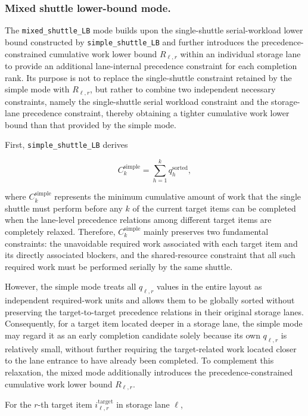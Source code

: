 \subsubsection{Mixed shuttle lower-bound mode.}

The \texttt{mixed\_shuttle\_LB} mode builds upon the single-shuttle
serial-workload lower bound constructed by \texttt{simple\_shuttle\_LB} and
further introduces the precedence-constrained cumulative work lower bound
\(R_{\ell,r}\) within an individual storage lane to provide an additional
lane-internal precedence constraint for each completion rank. Its purpose is
not to replace the single-shuttle constraint retained by the simple mode with
\(R_{\ell,r}\), but rather to combine two independent necessary constraints,
namely the single-shuttle serial workload constraint and the storage-lane
precedence constraint, thereby obtaining a tighter cumulative work lower bound
than that provided by the simple mode.

First, \texttt{simple\_shuttle\_LB} derives

\[
C_k^{\mathrm{simple}}
=
\sum_{h=1}^{k}
q_h^{\mathrm{sorted}},
\]

where \(C_k^{\mathrm{simple}}\) represents the minimum cumulative amount of
work that the single shuttle must perform before any \(k\) of the current
target items can be completed when the lane-level precedence relations among
different target items are completely relaxed. Therefore,
\(C_k^{\mathrm{simple}}\) mainly preserves two fundamental constraints: the
unavoidable required work associated with each target item and its directly
associated blockers, and the shared-resource constraint that all such required
work must be performed serially by the same shuttle.

However, the simple mode treats all \(q_{\ell,r}\) values in the entire layout
as independent required-work units and allows them to be globally sorted
without preserving the target-to-target precedence relations in their original
storage lanes. Consequently, for a target item located deeper in a storage
lane, the simple mode may regard it as an early completion candidate solely
because its own \(q_{\ell,r}\) is relatively small, without further requiring
the target-related work located closer to the lane entrance to have already
been completed. To complement this relaxation, the mixed mode additionally
introduces the precedence-constrained cumulative work lower bound
\(R_{\ell,r}\).

For the \(r\)-th target item \(i^{\mathrm{target}}_{\ell,r}\) in storage lane
\(\ell\),

